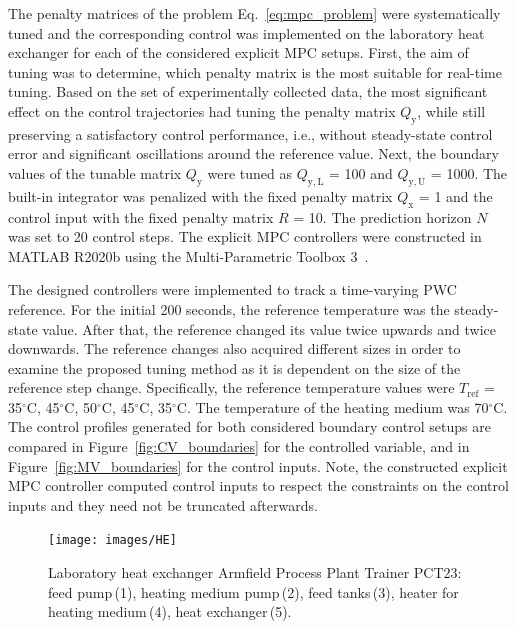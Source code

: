 \documentclass[preprint,12pt]{elsarticle}
\begin{document}
	The penalty matrices of the problem Eq.~\eqref{eq:mpc_problem} were systematically tuned and the corresponding control was implemented on the laboratory heat exchanger for each of the considered explicit MPC setups. 
	First, the aim of tuning was to determine, which penalty matrix is the most suitable for real-time tuning. Based on the set of experimentally collected data, the most significant effect on the control trajectories had tuning the penalty matrix $Q_\mathrm{y}$, while still preserving a satisfactory control performance, i.e., without steady-state control error and significant oscillations around the reference value. Next, the boundary values of the tunable matrix $Q_\mathrm{y}$ were tuned as $Q_\mathrm{y, L}$ = 100 and $Q_\mathrm{y, U}$ = 1000. The built-in integrator was penalized with the fixed penalty matrix $Q_\mathrm{x}$ = 1 and the control input with the fixed penalty matrix $R$ = 10. The prediction horizon $N$ was set to 20 control steps. The explicit MPC controllers were constructed in MATLAB R2020b using the Multi-Parametric Toolbox 3~\cite{mpt_conf}. 
	
	
	The designed controllers were implemented to track a time-varying PWC reference. 
	For the initial 200 seconds, the reference temperature was the steady-state value. After that, the reference changed its value twice upwards and twice downwards. The reference changes also acquired different sizes in order to examine the proposed tuning method as it is dependent on the size of the reference step change. Specifically, the reference temperature values were $T_{\mathrm{ref}}$ = 35$^{\circ}\mathrm{C}$, 45$^{\circ}\mathrm{C}$, 50$^{\circ}\mathrm{C}$, 45$^{\circ}\mathrm{C}$, 35$^{\circ}\mathrm{C}$. The temperature of the heating medium was 70$^{\circ}\mathrm{C}$. The control profiles generated for both considered boundary control setups are compared in Figure~\ref{fig:CV_boundaries} for the controlled variable, and in Figure~\ref{fig:MV_boundaries} for the control inputs. 
	Note, the constructed explicit MPC controller computed control inputs to respect the constraints on the control inputs and they need not be truncated afterwards.  
	
	
	\begin{figure}
		\begin{center}
			\texttt{[image: images/HE]}
			\caption[Heat exchanger Armfield Process Plant Trainer PCT23]{Laboratory heat exchanger Armfield Process Plant Trainer PCT23: feed pump\,(1), heating medium pump\,(2), feed tanks\,(3), heater for heating medium\,(4), heat exchanger\,(5).}
			\label{fig:HE}
		\end{center}
	\end{figure}
	
\end{document}

